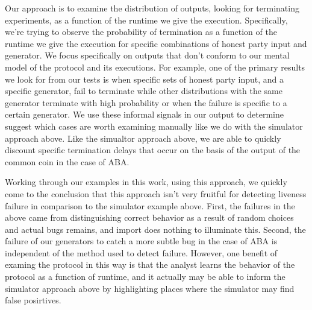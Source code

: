 Our approach is to examine the distribution of outputs, looking for terminating
experiments, as a function of the runtime we give the execution.  Specifically,
we're trying to observe the probability of termination as a function of the
runtime we give the execution for specific combinations of honest party input
and generator.  We focus specifically on outputs that don't conform to our
mental model of the protocol and its executions.  For example, one of the
primary results we look for from our tests is when specific sets of honest
party input, and a specific generator, fail to terminate while other
distributions with the same generator terminate with high probability or when
the failure is specific to a certain generator.  We use these informal signals
in our output to determine suggest which cases are worth examining manually
like we do with the simulator approach above.  Like the simualtor approach
above, we are able to quickly discount specific termination delays that occur
on the basis of the output of the common coin in the case of ABA.

Working through our examples in this work, using this approach, we quickly come
to the conclusion that this approach isn't very fruitful for detecting liveness
failure in comparison to the simulator example above.  First, the failures in
the above came from distinguishing correct behavior as a result of random
choices and actual bugs remains, and import does nothing to illuminate this.
Second, the failure of our generators to catch a more subtle bug in the case of
ABA is independent of the method used to detect failure.  However, one benefit
of examing the protocol in this way is that the analyst learns the behavior of
the protocol as a function of runtime, and it actually may be able to inform
the simulator approach above by highlighting places where the simulator may
find false posirtives.


